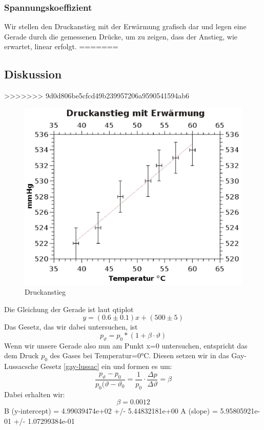 \documentclass{article}
\begin{document}
\subsubsection{Spannungskoeffizient}
Wir stellen den Druckanstieg mit der Erwärmung grafisch dar und legen eine Gerade durch die gemessenen Drücke, um zu zeigen, dass der Anstieg, wie erwartet, linear erfolgt. 
=======

\subsection{Diskussion}
>>>>>>> 9d0d806be5cfcd49b239957206a9590541594ab6

\begin{center}
\begin{figure}

\includegraphics[scale=0.7]{warmdruck.eps}
\caption{Druckanstieg}
\end{figure}
\end{center}
Die Gleichung der Gerade ist laut qtiplot  $$y=(0.6 \pm 0.1)x+(500\pm5)$$
Das Gesetz, das wir dabei untersuchen, ist 
$$p_{\vartheta}=p_0*(1+\beta\cdot\vartheta)$$
Wenn wir unsere Gerade also nun am Punkt x=0 untersuchen, entspricht das dem Druck $p_0$ des Gases bei Temperatur=0°C. Diesen setzen wir in das Gay-Lussacsche Gesetz \ref{gay-lussac}  ein und formen es um:
$$\frac{p_{\vartheta}-p_0}{p_0(\vartheta-\vartheta_0}=\frac{1}{p_0}\cdot \frac{\Delta p}{\Delta \vartheta}=\beta$$
Dabei erhalten wir:
$$\beta=0.0012$$
B (y-intercept) = 4.99039474e+02 +/- 5.44832181e+00
A (slope) = 5.95805921e-01 +/- 1.07299384e-01
\end{document}
